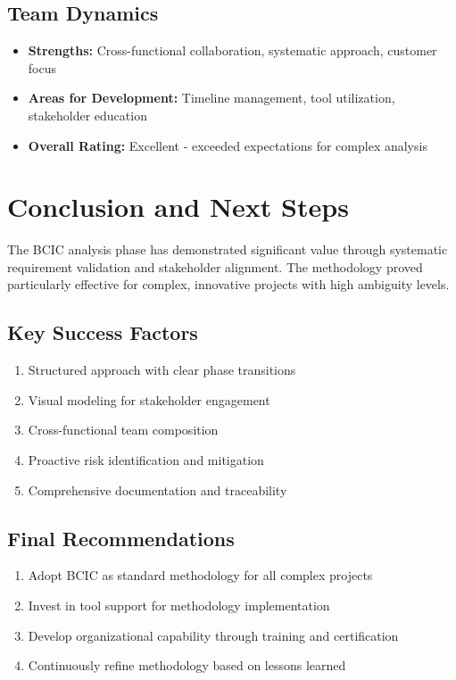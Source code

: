 \documentclass[12pt,a4paper]{article}
\begin{document}
\subsection{Team Dynamics}
\begin{itemize}
    \item \textbf{Strengths:} Cross-functional collaboration, systematic approach, customer focus
    \item \textbf{Areas for Development:} Timeline management, tool utilization, stakeholder education
    \item \textbf{Overall Rating:} Excellent - exceeded expectations for complex analysis
\end{itemize}

\section{Conclusion and Next Steps}

The BCIC analysis phase has demonstrated significant value through systematic requirement validation and stakeholder alignment. The methodology proved particularly effective for complex, innovative projects with high ambiguity levels.

\subsection{Key Success Factors}
\begin{enumerate}
    \item Structured approach with clear phase transitions
    \item Visual modeling for stakeholder engagement
    \item Cross-functional team composition
    \item Proactive risk identification and mitigation
    \item Comprehensive documentation and traceability
\end{enumerate}

\subsection{Final Recommendations}
\begin{enumerate}
    \item Adopt BCIC as standard methodology for all complex projects
    \item Invest in tool support for methodology implementation
    \item Develop organizational capability through training and certification
    \item Continuously refine methodology based on lessons learned
\end{enumerate}
\end{document}
